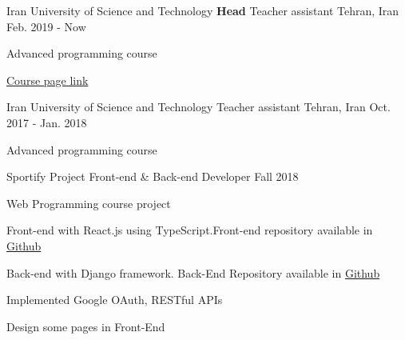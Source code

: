 

\begin{cventries}

  \cventry
  {Iran University of Science and Technology} %
  {\textbf{Head} Teacher assistant} %
  {Tehran, Iran} %
  {Feb. 2019 - Now} %
  {
    \begin{cvitems}
      \item 
      Advanced programming course
      \item
      \textcolor{blue}{\href{https://sauleh.github.io/ap97/}{Course page link}}
    \end{cvitems}
  }

  \cventry
  {Iran University of Science and Technology} %
  {Teacher assistant} %
  {Tehran, Iran} %
  {Oct. 2017 - Jan. 2018} %
  {
    \begin{cvitems}
      \item 
      Advanced programming course
    \end{cvitems}
  }

  \cventry
  {Sportify Project} %
  {Front-end \& Back-end Developer} %
  {} %
  {Fall 2018} %
  {
    \begin{cvitems} %
      \item {Web Programming course project}
      \item {Front-end with React.js using TypeScript.Front-end repository available in \href{https://github.com/ali4heydari/sportify-frontend}{Github}}
      \item {Back-end with Django framework. Back-End Repository available in \href{https://github.com/ali4heydari/sportify-backend}{Github}}
      \item {Implemented Google OAuth, RESTful APIs}
      \item {Design some pages in Front-End}
    \end{cvitems}
  }



\end{cventries}
